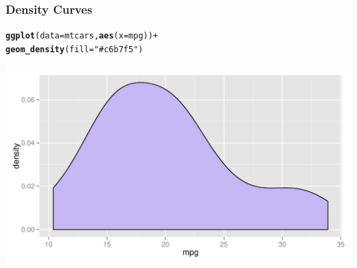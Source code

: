 \documentclass[12pt]{beamer}\usepackage[]{graphicx}\usepackage[]{color}
\makeatletter
\newcommand{\hlstr}[1]{\textcolor[rgb]{0.192,0.494,0.8}{#1}}%
\newcommand{\hlopt}[1]{\textcolor[rgb]{0,0,0}{#1}}%
\newcommand{\hlstd}[1]{\textcolor[rgb]{0.345,0.345,0.345}{#1}}%
\newcommand{\hlkwc}[1]{\textcolor[rgb]{0.333,0.667,0.333}{#1}}%
\newcommand{\hlkwd}[1]{\textcolor[rgb]{0.737,0.353,0.396}{\textbf{#1}}}%
\newenvironment{kframe}{%
 \def\at@end@of@kframe{}%
 \ifinner\ifhmode%
  \def\at@end@of@kframe{\end{minipage}}%
  \begin{minipage}{\columnwidth}%
 \fi\fi%
 \def\FrameCommand##1{\hskip\@totalleftmargin \hskip-\fboxsep
 \colorbox{shadecolor}{##1}\hskip-\fboxsep
     \hskip-\linewidth \hskip-\@totalleftmargin \hskip\columnwidth}%
 \MakeFramed {\advance\hsize-\width
   \@totalleftmargin\z@ \linewidth\hsize
   \@setminipage}}%
 {\par\unskip\endMakeFramed%
 \at@end@of@kframe}
\newenvironment{knitrout}{}{} %
\makeatother
\begin{document}
\begin{frame}[fragile]
\frametitle{Density Curves}

\begin{knitrout}\scriptsize
{}\color{fgcolor}\begin{kframe}
\begin{alltt}
\hlkwd{ggplot}\hlstd{(}\hlkwc{data} \hlstd{= mtcars,} \hlkwd{aes}\hlstd{(}\hlkwc{x} \hlstd{= mpg))} \hlopt{+}
  \hlkwd{geom_density}\hlstd{(}\hlkwc{fill} \hlstd{=} \hlstr{"#c6b7f5"}\hlstd{)}
\end{alltt}
\end{kframe}

{\centering \includegraphics[width=.9\linewidth,height=.5\linewidth]{figure/unnamed-chunk-9-1} 

}



\end{knitrout}

\end{frame}

\end{document}
